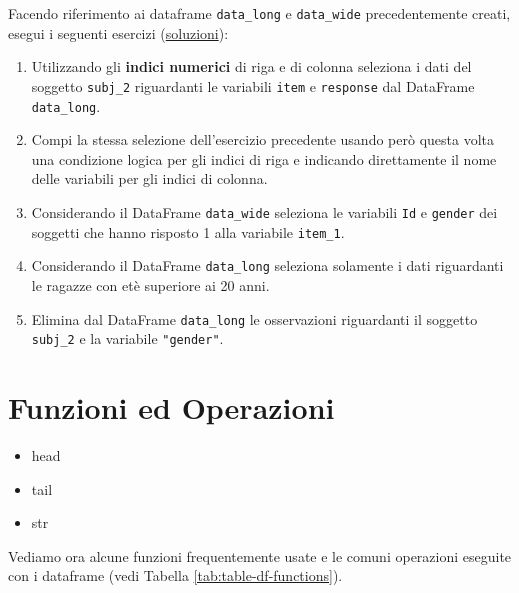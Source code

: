 \documentclass[
]{book}
\providecommand{\tightlist}{%
  \setlength{\itemsep}{0pt}\setlength{\parskip}{0pt}}
\begin{document}
Facendo riferimento ai dataframe \texttt{data\_long} e \texttt{data\_wide} precedentemente creati, esegui i seguenti esercizi (\href{https://github.com/psicostat/Introduction2R/blob/master/exercises/chapter-10.R}{soluzioni}):

\begin{enumerate}
\def\labelenumi{\arabic{enumi}.}
\tightlist
\item
  Utilizzando gli \textbf{indici numerici} di riga e di colonna seleziona i dati del soggetto \texttt{subj\_2} riguardanti le variabili \texttt{item} e \texttt{response} dal DataFrame \texttt{data\_long}.
\item
  Compi la stessa selezione dell'esercizio precedente usando però questa volta una condizione logica per gli indici di riga e indicando direttamente il nome delle variabili per gli indici di colonna.
\item
  Considerando il DataFrame \texttt{data\_wide} seleziona le variabili \texttt{Id} e \texttt{gender} dei soggetti che hanno risposto 1 alla variabile \texttt{item\_1}.
\item
  Considerando il DataFrame \texttt{data\_long} seleziona solamente i dati riguardanti le ragazze con etè superiore ai 20 anni.
\item
  Elimina dal DataFrame \texttt{data\_long} le osservazioni riguardanti il soggetto \texttt{subj\_2} e la variabile \texttt{"gender"}.
\end{enumerate}

\hypertarget{funzioni-ed-operazioni-1}{%
\section{Funzioni ed Operazioni}\label{funzioni-ed-operazioni-1}}

\begin{itemize}
\tightlist
\item
  head
\item
  tail
\item
  str
\end{itemize}

Vediamo ora alcune funzioni frequentemente usate e le comuni operazioni eseguite con i dataframe (vedi Tabella \ref{tab:table-df-functions}).
\end{document}
